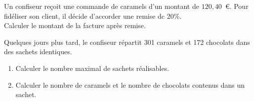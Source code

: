 \begin{myenumerate}
\item Un confiseur reçoit une commande de caramels d'un montant de $120,40$~\textgreek{\euro}. Pour fidéliser son client, il décide d'accorder une remise dc 20\%.\\
 Calculer le montant de la facture après remise.
\item Quelques jours plus tard, le confiseur répartit 301 caramels et 172 chocolats dans des sachets identiques.
\begin{enumerate}
\item Calculer le nombre maximal de sachets réalisables. 
\item Calculer le nombre de caramels et le nombre de chocolats contenus dans un sachet.
\end{enumerate}
\end{myenumerate}